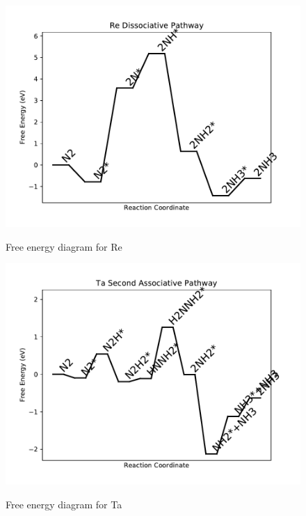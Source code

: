 \documentclass{article}
\begin{document}
\begin{figure}
\includegraphics[width=1\linewidth]{data/plots/Re_dissociative.pdf}
\label{fig:Re_dissociative}
\caption{Free energy diagram for Re}
\end{figure}

\begin{figure}
\includegraphics[width=1\linewidth]{data/plots/Ta_associative_2.pdf}
\label{fig:Ta_associative_2}
\caption{Free energy diagram for Ta}
\end{figure}
\end{document}
